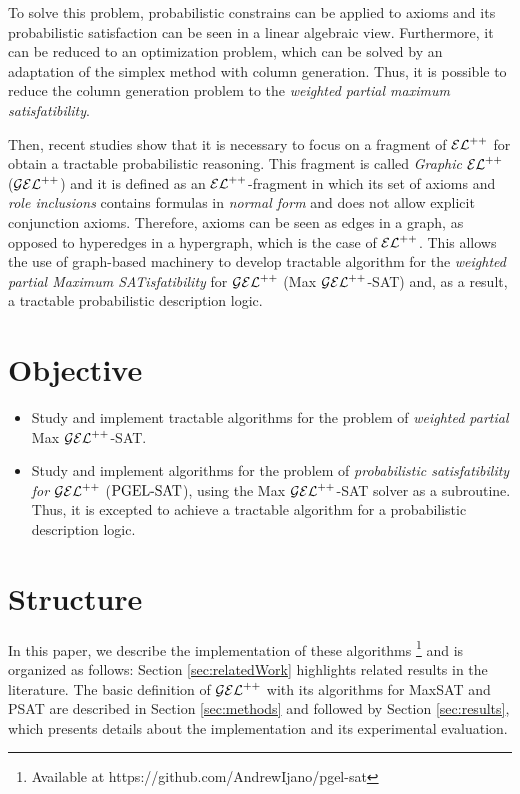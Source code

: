     
To solve this problem, probabilistic constrains can be applied to axioms and its probabilistic satisfaction can be seen in a linear algebraic view. Furthermore, it can be reduced to an optimization problem, which can be solved by an adaptation of the simplex method with column generation. \citep{Fin2019b} Thus, it is possible to reduce the column generation problem to the \emph{weighted partial maximum satisfatibility}.


Then, recent studies show that it is necessary to focus on a fragment of $\mathcal{EL}^{++}$ for obtain a tractable probabilistic reasoning. This fragment is called \emph{Graphic} $\mathcal{EL}^{++}$ ($\mathcal{GEL}^{++}$) and it is defined as an $\mathcal{EL}^{++}$-fragment in which its set of axioms and \emph{role inclusions} contains formulas in \emph{normal form} and does not allow explicit conjunction axioms. Therefore, axioms can be seen as edges in a graph, as opposed to hyperedges in a hypergraph, which is the case of $\mathcal{EL}^{++}$. This allows the use of graph-based machinery to develop tractable algorithm for the \emph{weighted partial Maximum SATisfatibility} for $\mathcal{GEL}^{++}$ (Max $\mathcal{GEL}^{++}$-SAT) and, as a result, a tractable probabilistic description logic.

\section{Objective}
\begin{itemize}
  \item Study and implement tractable algorithms for the problem of \emph{weighted partial} Max $\mathcal{GEL}^{++}$-SAT. 
  \item Study and implement algorithms for the problem of \emph{probabilistic satisfatibility for $\mathcal{GEL}^{++}$} ($\text{PGEL-SAT}$), using the Max $\mathcal{GEL}^{++}$-SAT solver as a subroutine. Thus, it is excepted to achieve a tractable algorithm for a probabilistic description logic.
\end{itemize}

\section{Structure}
In this paper, we describe the implementation of these algorithms \footnote{Available at https://github.com/AndrewIjano/pgel-sat} and is organized as follows: Section \ref{sec:relatedWork} highlights related results in the literature. The basic definition of $\mathcal{GEL}^{++}$ with its algorithms for MaxSAT and PSAT are described in Section \ref{sec:methods} and followed by Section \ref{sec:results}, which presents details about the implementation and its experimental evaluation.
